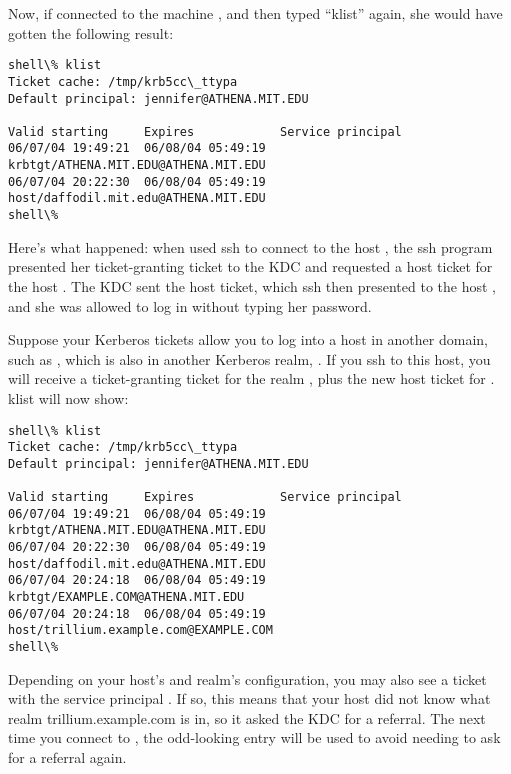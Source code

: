\documentclass[letterpaper,10pt,english]{sphinxmanual}
\begin{document}
Now, if  connected to the machine ,
and then typed ``klist'' again, she would have gotten the following
result:

\begin{Verbatim}[commandchars=\\\{\}]
shell\% klist
Ticket cache: /tmp/krb5cc\_ttypa
Default principal: jennifer@ATHENA.MIT.EDU

Valid starting     Expires            Service principal
06/07/04 19:49:21  06/08/04 05:49:19  krbtgt/ATHENA.MIT.EDU@ATHENA.MIT.EDU
06/07/04 20:22:30  06/08/04 05:49:19  host/daffodil.mit.edu@ATHENA.MIT.EDU
shell\%
\end{Verbatim}

Here's what happened: when  used ssh to connect to the
host , the ssh program presented her
ticket-granting ticket to the KDC and requested a host ticket for the
host .  The KDC sent the host ticket, which ssh
then presented to the host , and she was allowed
to log in without typing her password.

Suppose your Kerberos tickets allow you to log into a host in another
domain, such as , which is also in another
Kerberos realm, .  If you ssh to this host, you will
receive a ticket-granting ticket for the realm , plus
the new host ticket for .  klist will now
show:

\begin{Verbatim}[commandchars=\\\{\}]
shell\% klist
Ticket cache: /tmp/krb5cc\_ttypa
Default principal: jennifer@ATHENA.MIT.EDU

Valid starting     Expires            Service principal
06/07/04 19:49:21  06/08/04 05:49:19  krbtgt/ATHENA.MIT.EDU@ATHENA.MIT.EDU
06/07/04 20:22:30  06/08/04 05:49:19  host/daffodil.mit.edu@ATHENA.MIT.EDU
06/07/04 20:24:18  06/08/04 05:49:19  krbtgt/EXAMPLE.COM@ATHENA.MIT.EDU
06/07/04 20:24:18  06/08/04 05:49:19  host/trillium.example.com@EXAMPLE.COM
shell\%
\end{Verbatim}

Depending on your host's and realm's configuration, you may also see a
ticket with the service principal .  If
so, this means that your host did not know what realm
trillium.example.com is in, so it asked the  KDC for
a referral.  The next time you connect to ,
the odd-looking entry will be used to avoid needing to ask for a
referral again.
\end{document}
